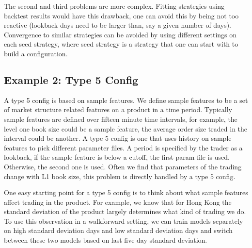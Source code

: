 \documentclass[a4paper]{article}
\begin{document}
The second and third problems are more complex. Fitting strategies using backtest results would have this drawback, one can avoid this by being not too reactive (lookback days need to be larger than, say a given number of days). Convergence to similar strategies can be avoided by using different settings on each seed strategy, where seed strategy is a strategy that one can start with to build a configuration.

\subsection{Example 2: Type 5 Config}
A type 5 config is based on sample features. We define sample features to be a set of market structure related features on a product in a time period. Typically sample features are defined over fifteen minute time intervals, for example, the level one book size could be a sample feature, the average order size traded in the interval could be another. A type 5  config is one that uses history on sample features to pick different parameter files. A period is specified by the trader as a lookback, if the sample feature is below a cutoff, the first param file is used. Otherwise, the second one is used. Often we find that parameters of the trading change with L1 book size, this problem is directly handled by a type 5 config.

One easy starting point for a type 5 config is to think about what sample features affect trading in the product. For example, we know that for Hong Kong the standard deviation of the product largely determines what kind of trading we do. To use this observation in a walkforward setting, we can train models separately on high standard deviation days and low standard deviation days and switch between these two models based on last five day standard deviation.
\end{document}
